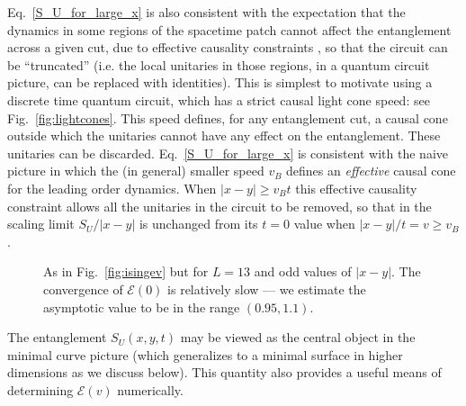 \documentclass[aps,prx,twocolumn,superscriptaddress,floatfix,nofootinbib,prx]{revtex4}
\renewcommand{\>}{\right\rangle}
\newcommand{\<}{\left\langle}
\newcommand{\lt}{\mathcal{E}}
\begin{document}
Eq.~\ref{S_U_for_large_x} is also consistent with the expectation that the dynamics in some regions of the spacetime patch cannot affect the entanglement across a given cut, due to effective causality constraints \cite{ms}, so that the circuit can be ``truncated'' (i.e. the local unitaries in those regions, in  a quantum circuit picture, can be replaced with identities).
This is simplest to motivate using  a discrete time quantum circuit, which has a strict causal light cone speed: see Fig.~\ref{fig:lightcones}. This speed defines, for any entanglement cut, a causal cone outside which the unitaries cannot have any effect on the entanglement. These unitaries can be discarded. 
Eq.~\ref{S_U_for_large_x} is consistent with the naive picture in which the (in general) smaller speed $v_B$ defines an \textit{effective} causal cone for the leading order dynamics.
When  $|x-y|\geq v_B t$ this effective causality constraint allows all the unitaries in the circuit to be removed, so that in the scaling limit $S_U/|x-y|$ is unchanged from its $t=0$ value when $|x-y|/t=v \geq v_B$. 

\begin{figure}[t]
\caption{
As in Fig.~\ref{fig:isingev} but for $L=13$ and odd values of $|x-y|$. The convergence of $\lt(0)$ is relatively slow --- we estimate the asymptotic value to be in the range $(0.95,1.1)$.
}  \label{fig:isingev2}
\end{figure}



The entanglement $S_U(x,y,t)$ may be viewed as the central object in the minimal curve picture (which generalizes to a minimal surface in higher dimensions as we discuss below).  This quantity also provides a useful means of determining $\lt(v)$ numerically.
\end{document}

